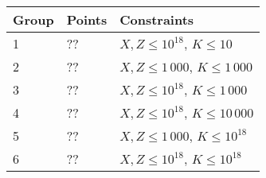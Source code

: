 \noindent
\begin{tabular}{| l | l | l |}
\hline
Group & Points & Constraints \\ \hline
1     & ??      & $X, Z \le 10^{18}$, $K \le 10$ \\ \hline
2     & ??      & $X, Z \le 1\,000$, $K \le 1\,000$ \\ \hline
3     & ??      & $X, Z \le 10^{18}$, $K \le 1\,000$ \\ \hline
4     & ??      & $X, Z \le 10^{18}$, $K \le 10\,000$ \\ \hline
5     & ??     & $X, Z \le 1\,000$, $K \le 10^{18}$ \\ \hline
6     & ??     & $X, Z \le 10^{18}$, $K \le 10^{18}$ \\ \hline
\end{tabular}
